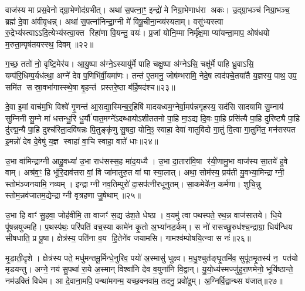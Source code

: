 {\anuvakamend[{अह्रु॑त॒ एक॑विशतिश्च। (12)}]}

वाज॑स्य मा प्रस॒वेनोद्ग्रा॒भेणोद॑ग्रभीत्। अथा॑ स॒पत्ना॒ꣳ॒ इन्द्रो॑ मे निग्रा॒भेणाध॑रा अकः। उ॒द्ग्रा॒भञ्च॑ निग्रा॒भञ्च॒ ब्रह्म॑ दे॒वा अ॑वीवृधन्न्। अथा॑ स॒पत्ना॑निन्द्रा॒ग्नी मे॑ विषू॒चीना॒न्व्य॑स्यताम्। वसु॑भ्यस्त्वा रु॒द्रेभ्य॑स्त्वाऽऽदि॒त्येभ्य॑स्त्वा॒क्त रिहा॑णा वि॒यन्तु॒ वयः॑। प्र॒जां योनि॒म्मा निर्मृ॑क्ष॒मा प्या॑यन्ता॒माप॒ ओष॑धयो म॒रुता॒म्पृष॑तयस्स्थ॒ दिवम्॥२२॥

ग॒च्छ॒ ततो॑ नो॒ वृष्टि॒मेर॑य। आ॒यु॒ष्पा अ॑ग्ने॒ऽस्यायु॑र्मे पाहि चक्षु॒ष्पा अ॑ग्नेऽसि॒ चक्षु॑र्मे पाहि ध्रु॒वाऽसि॒ यम्प॑रि॒धिम्प॒र्यध॑त्था॒ अग्ने॑ देव प॒णिभि॑र्वी॒यमा॑णः। तन्त॑ ए॒तमनु॒ जोष॑म्भरामि॒ नेदे॒ष त्वद॑पचे॒तया॑तै य॒ज्ञस्य॒ पाथ॒ उप॒ समि॑त सस्रा॒वभा॑गास्स्थे॒षा बृ॒हन्त॑ प्रस्तरे॒ष्ठा ब॑र्\mbox{}हि॒षद॑श्च॥२३॥

दे॒वा इ॒मां वाच॑म॒भि विश्वे॑ गृ॒णन्त॑ आ॒सद्या॒स्मिन्ब॒र्॒हिषि॑ मादयध्वम॒ग्नेर्वा॒मप॑न्नगृहस्य॒ सद॑सि सादयामि सु॒म्नाय॑ सुम्निनी सु॒म्ने मा॑ धत्तन्धु॒रि धु॒र्यौ॑ पात॒मग्ने॑ऽदब्धायोऽशीततनो पा॒हि मा॒ऽद्य दि॒वः पा॒हि प्रसि॑त्यै पा॒हि दुरि॑ष्ट्यै पा॒हि दु॑रद्म॒न्यै पा॒हि दुश्च॑रिता॒दवि॑षन्नः पि॒तुङ्कृ॑णु सु॒षदा॒ योनि॒ꣵ॒ स्वाहा॒ देवा॑ गातुविदो गा॒तुं वि॒त्वा गा॒तुमि॑त॒ मन॑सस्पत इ॒मन्नो॑ देव दे॒वेषु॑ य॒ज्ञ स्वाहा॑ वा॒चि स्वाहा॒ वाते॑ धाः॥२४॥

{\anuvakamend[{दिव॑ञ्च वि॒त्वा गा॒तुन्त्रयो॑दश च। (13)}]}

उ॒भा वा॑मिन्द्राग्नी आहु॒वध्या॑ उ॒भा राध॑सस्स॒ह मा॑द॒यध्यै। उ॒भा दा॒तारा॑वि॒षा र॑यी॒णामु॒भा वाज॑स्य सा॒तये॑ हुवे वाम्। अश्र॑व॒ꣳ॒ हि भू॑रि॒दाव॑त्तरा वां॒ वि जा॑मातुरु॒त वा॑ घा स्या॒लात्। अथा॒ सोम॑स्य॒ प्रय॑ती यु॒वभ्या॒मिन्द्राग्नी॒ स्तोम॑ञ्जनयामि॒ नव्यम्। इन्द्राग्नी नव॒तिम्पुरो॑ दा॒सप॑त्नीरधूनुतम्। सा॒कमेके॑न॒ कर्म॑णा। शुचि॒न्नु स्तोम॒न्नव॑जातम॒द्येन्द्राग्नी वृत्रहणा जु॒षेथाम्॥२५॥

उ॒भा हि वाꣳ॑ सु॒हवा॒ जोह॑वीमि॒ ता वाजꣳ॑ स॒द्य उ॑श॒ते धेष्ठा। व॒यमु॑ त्वा पथस्पते॒ रथ॒न्न वाज॑सातये। धि॒ये पू॑षन्नयुज्महि। प॒थस्प॑थः॒ परि॑पतिं वच॒स्या कामे॑न कृ॒तो अ॒भ्या॑नड॒र्कम्। स नो॑ रासच्छु॒रुध॑श्च॒न्द्राग्रा॒ धिय॑न्धिय सीषधाति॒ प्र पू॒षा। क्षेत्र॑स्य॒ पति॑ना व॒य हि॒तेने॑व जयामसि। गामश्व॑म्पोषयि॒त्न्वा स नः॑॥२६॥

मृ॒डा॒ती॒दृशे। क्षेत्र॑स्य पते॒ मधु॑मन्तमू॒र्मिन्धे॒नुरि॑व॒ पयो॑ अ॒स्मासु॑ धुक्ष्व। म॒धु॒श्चुत॑ङ्घृ॒तमि॑व॒ सुपू॑तमृ॒तस्य॑ न॒ पत॑यो मृडयन्तु। अग्ने॒ नय॑ सु॒पथा॑ रा॒ये अ॒स्मान् विश्वा॑नि देव व॒युना॑नि वि॒द्वान्। यु॒यो॒ध्य॑स्मज्जु॑हुरा॒णमेनो॒ भूयि॑ष्ठान्ते॒ नम॑उक्तिं विधेम। आ दे॒वाना॒मपि॒ पन्था॑मगन्म॒ यच्छ॒क्नवा॑म॒ तदनु॒ प्रवो॑ढुम्। अ॒ग्निर्वि॒द्वान्थ्स य॑जात्॥२७॥

